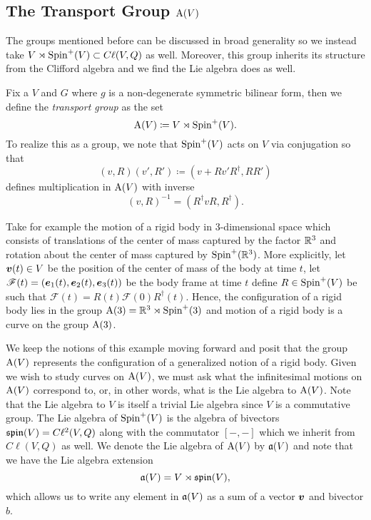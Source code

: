 \documentclass{article}
\begin{document}
\subsection{The Transport Group $\operatorname{A}(V)$}

The groups mentioned before can be discussed in broad generality so we instead take $V\rtimes \operatorname{Spin}^+(V) \subset C\ell(V,Q)$ as well. Moreover, this group inherits its structure from the Clifford algebra and we find the Lie algebra does as well. 

\begin{definition}
Fix a $V$ and $G$ where $g$ is a non-degenerate symmetric bilinear form, then we define the \emph{transport group} as the set
\begin{equation}
\operatorname{A}(V)\coloneqq V\rtimes \operatorname{Spin}^+(V).
\end{equation}
To realize this as a group, we note that $\operatorname{Spin}^+(V)$ acts on $V$ via conjugation so that
\begin{equation}
\label{eq:product_in_A}
(v,R)(v',R')\coloneqq(v+Rv'R^\dagger, RR')
\end{equation}
defines multiplication in $\operatorname{A}(V)$ with inverse
\begin{equation}
(v,R)^{-1} = (R^\dagger v R, R^\dagger).
\end{equation}
\end{definition}

\begin{example}
Take for example the motion of a rigid body in 3-dimensional space which consists of translations of the center of mass captured by the factor $\mathbb{R}^3$ and rotation about the center of mass captured by $\operatorname{Spin}^+(\mathbb{R}^3)$. More explicitly, let $\boldsymbol{v}(t) \in V$ be the position of the center of mass of the body at time $t$, let $\mathscr{F}(t)=(\boldsymbol{e}_1(t),\boldsymbol{e}_2(t),\boldsymbol{e}_3(t))$ be the body frame at time $t$ define $R \in \operatorname{Spin}^+(V)$ be such that $\mathscr{F}(t)=R(t)\mathscr{F}(0)R^\dagger(t)$. Hence, the configuration of a rigid body lies in the group $\operatorname{A}(3)=\mathbb{R}^3 \rtimes \operatorname{Spin}^+(3)$ and motion of a rigid body is a curve on the group $\operatorname{A}(3)$.
\end{example}

We keep the notions of this example moving forward and posit that the group $\operatorname{A}(V)$ represents the configuration of a generalized notion of a rigid body. Given we wish to study curves on $\operatorname{A}(V)$, we must ask what the infinitesimal motions on $\operatorname{A}(V)$ correspond to, or, in other words, what is the Lie algebra to $\operatorname{A}(V)$. Note that the Lie algebra to $V$ is itself a trivial Lie algebra since $V$ is a commutative group. The Lie algebra of $\operatorname{Spin}^+(V)$ is the algebra of bivectors $\mathfrak{spin}(V)=C\ell^2(V,Q)$ along with the commutator $[-,-]$ which we inherit from $C\ell(V,Q)$ as well. We denote the Lie algebra of $\operatorname{A}(V)$ by $\mathfrak{a}(V)$ and note that we have the Lie algebra extension
\begin{equation}
\label{eq:extension}
\mathfrak{a}(V)=V\rtimes\mathfrak{spin}(V),
\end{equation}
which allows us to write any element in $\mathfrak{a}(V)$ as a sum of a vector $\boldsymbol{v}$ and bivector $b$. 
\end{document}
